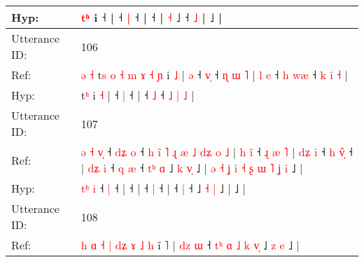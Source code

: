 \documentclass[10pt]{article}
\DeclareRobustCommand{\hl}[1]{{\textcolor{red}{#1}}}
\begin{document}
\begin{longtable}{ll}
 \\
Hyp: & \hl{}\hl{}\hl{}\hl{t}\hl{ʰ} i ˧\hl{}\hl{}\hl{}\hl{}\hl{}\hl{}\hl{}\hl{}\hl{}\hl{}\hl{}\hl{} |\hl{}\hl{} ˧ \hl{}\hl{|} ˧\hl{}\hl{}\hl{}\hl{}\hl{}\hl{} |\hl{}\hl{}\hl{}\hl{}\hl{} ˧\hl{}\hl{}\hl{}\hl{}\hl{}\hl{}\hl{}\hl{}\hl{}\hl{}\hl{}\hl{}\hl{}\hl{}\hl{}\hl{}\hl{}\hl{}\hl{} |\hl{}\hl{}\hl{}\hl{}\hl{}\hl{}\hl{}\hl{}\hl{} \hl{˧} ˩\hl{}\hl{}\hl{}\hl{}\hl{}\hl{}\hl{} ˧\hl{}\hl{}\hl{}\hl{}\hl{} \hl{}\hl{˩} |\hl{}\hl{}\hl{}\hl{} ˩ |
 \\
\midrule
Utterance ID: & 106 \\
Ref: & \hl{ə}\hl{ }\hl{˧}\hl{ }t\hl{s}\hl{ }\hl{o}\hl{ }\hl{˧}\hl{ }\hl{m}\hl{ }\hl{ɤ}\hl{ }\hl{˧}\hl{ }\hl{ɲ} i \hl{˩} |\hl{ }\hl{ə} ˧ \hl{v}\hl{̩} ˧\hl{ }\hl{ɳ}\hl{ }\hl{ɯ}\hl{ }\hl{˥} |\hl{ }\hl{l}\hl{ }\hl{e} ˧\hl{ }\hl{h} \hl{w}\hl{æ} ˧ \hl{k} \hl{i} \hl{˧} |
 \\
Hyp: & \hl{}\hl{}\hl{}\hl{}t\hl{}\hl{}\hl{}\hl{}\hl{}\hl{}\hl{}\hl{}\hl{}\hl{}\hl{}\hl{}\hl{ʰ} i \hl{˧} |\hl{}\hl{} ˧ \hl{}\hl{|} ˧\hl{}\hl{}\hl{}\hl{}\hl{}\hl{} |\hl{}\hl{}\hl{}\hl{} ˧\hl{}\hl{} \hl{}\hl{˩} ˧ \hl{˩} \hl{|} \hl{˩} |
 \\
\midrule
Utterance ID: & 107 \\
Ref: & \hl{ə}\hl{ }\hl{˧} \hl{v}\hl{̩} ˧\hl{ }\hl{d}\hl{ʑ} \hl{o} ˧\hl{ }\hl{h}\hl{ }\hl{i}\hl{̃}\hl{ }\hl{˥}\hl{ }\hl{ɻ}\hl{ }\hl{æ}\hl{ }\hl{˩}\hl{ }\hl{d}\hl{ʑ}\hl{ }\hl{o}\hl{ }\hl{˩} |\hl{ }\hl{h}\hl{ }\hl{i}\hl{̃} ˧\hl{ }\hl{ɻ}\hl{ }\hl{æ}\hl{ }\hl{˥} |\hl{ }\hl{d}\hl{ʑ}\hl{ }\hl{i} ˧\hl{ }\hl{h} \hl{v}\hl{̃}\hl{̩} ˧ |\hl{ }\hl{d}\hl{ʑ}\hl{ }\hl{i} ˧\hl{ }\hl{q} \hl{æ} ˧\hl{ }\hl{t}\hl{ʰ}\hl{ }\hl{ɑ} ˩ \hl{k} \hl{v}\hl{̩} ˩ |\hl{ }\hl{ə}\hl{ }\hl{˧}\hl{ }\hl{ʝ}\hl{ }\hl{i}\hl{ }\hl{˧}\hl{ }\hl{ʂ}\hl{ }\hl{ɯ}\hl{ }\hl{˥}\hl{ }\hl{ʝ}\hl{ }\hl{i} ˩ |
 \\
Hyp: & \hl{}\hl{t}\hl{ʰ} \hl{}\hl{i} ˧\hl{}\hl{}\hl{} \hl{|} ˧\hl{}\hl{}\hl{}\hl{}\hl{}\hl{}\hl{}\hl{}\hl{}\hl{}\hl{}\hl{}\hl{}\hl{}\hl{}\hl{}\hl{}\hl{}\hl{}\hl{} |\hl{}\hl{}\hl{}\hl{}\hl{} ˧\hl{}\hl{}\hl{}\hl{}\hl{}\hl{} |\hl{}\hl{}\hl{}\hl{}\hl{} ˧\hl{}\hl{} \hl{}\hl{}\hl{|} ˧ |\hl{}\hl{}\hl{}\hl{}\hl{} ˧\hl{}\hl{} \hl{|} ˧\hl{}\hl{}\hl{}\hl{}\hl{} ˩ \hl{˧} \hl{}\hl{|} ˩ |\hl{}\hl{}\hl{}\hl{}\hl{}\hl{}\hl{}\hl{}\hl{}\hl{}\hl{}\hl{}\hl{}\hl{}\hl{}\hl{}\hl{}\hl{}\hl{}\hl{} ˩ |
 \\
\midrule
Utterance ID: & 108 \\
Ref: & \hl{h}\hl{ }\hl{ɑ}\hl{ }\hl{˧}\hl{ }\hl{|}\hl{ }\hl{d}\hl{ʑ}\hl{ }\hl{ɤ}\hl{ }\hl{˩}\hl{ }\hl{h} i\hl{̃} \hl{˥} |\hl{ }\hl{d}\hl{z}\hl{ }\hl{ɯ} ˧ \hl{t}\hl{ʰ} \hl{ɑ} \hl{˩} \hl{k} \hl{v}\hl{̩} ˩\hl{ }\hl{z} \hl{e} ˩ |

\end{longtable}
\end{document}
